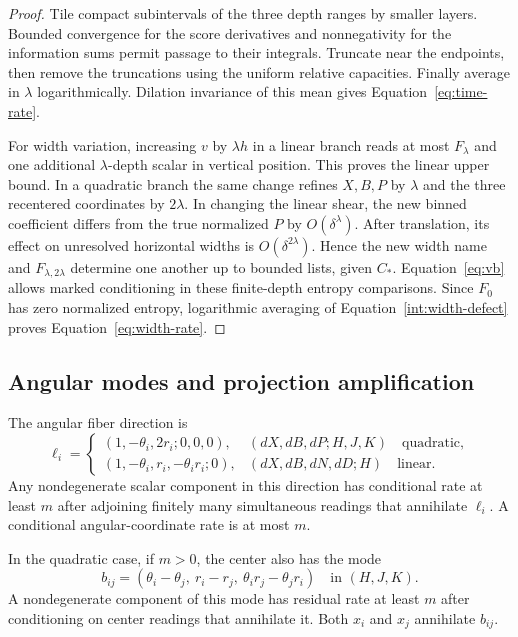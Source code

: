 \begin{proof}
Tile compact subintervals of the three depth ranges by smaller
layers. Bounded convergence for the score derivatives and
nonnegativity for the information sums permit passage to their
integrals. Truncate near the endpoints, then remove the
truncations using the uniform relative capacities. Finally
average in $\lambda$ logarithmically. Dilation invariance of
this mean gives Equation~\eqref{eq:time-rate}.

For width variation, increasing $v$ by $\lambda h$ in a linear
branch reads at most $F_\lambda$ and one additional
$\lambda$-depth scalar in vertical position. This proves the
linear upper bound. In a quadratic branch the same change
refines $X,B,P$ by $\lambda$ and the three recentered
coordinates by $2\lambda$. In changing the linear shear,
the new binned coefficient differs from the true normalized
$P$ by $O(\delta^\lambda)$. After translation, its effect on
unresolved horizontal widths is $O(\delta^{2\lambda})$.
Hence the new width name and $F_{\lambda,2\lambda}$ determine
one another up to bounded lists, given $C_*$.
Equation~\eqref{eq:vb} allows marked conditioning in these
finite-depth entropy comparisons. Since $F_0$ has zero
normalized entropy, logarithmic averaging of
Equation~\eqref{int:width-defect} proves
Equation~\eqref{eq:width-rate}.
\end{proof}

\subsection{Angular modes and projection amplification}

\begin{lemma}\label{int:modes-geometric}
The angular fiber direction is
\begin{equation}\label{int:angular-mode}
 \ell_i=
 \begin{cases}
 (1,-\theta_i,2r_i;0,0,0),
       &(dX,dB,dP;H,J,K)\quad\text{quadratic},\\
 (1,-\theta_i,r_i,-\theta_ir_i;0),
       &(dX,dB,dN,dD;H)\quad\text{linear}.
 \end{cases}
\end{equation}
Any nondegenerate scalar component in this direction has
conditional rate at least $m$ after adjoining finitely many
simultaneous readings that annihilate $\ell_i$. A conditional
angular-coordinate rate is at most $m$.

In the quadratic case, if $m>0$, the center also has the mode
\begin{equation}\label{int:commutator-mode}
 b_{ij}=(\theta_i-\theta_j,\ r_i-r_j,\
                    \theta_ir_j-\theta_jr_i)
       \quad\text{in }(H,J,K).
\end{equation}
A nondegenerate component of this mode has residual rate at
least $m$ after conditioning on center readings that annihilate it.
Both $x_i$ and $x_j$ annihilate $b_{ij}$.
\end{lemma}

